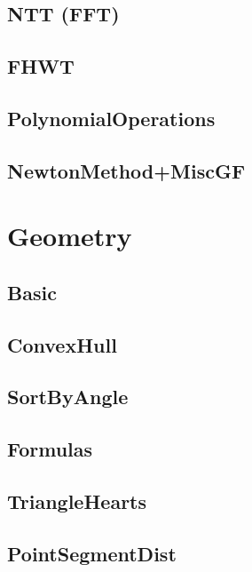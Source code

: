 \subsection{NTT (FFT)}


\subsection{FHWT}

\subsection{PolynomialOperations}

\subsection{NewtonMethod+MiscGF}

\section{Geometry}
\subsection{Basic}

\subsection{ConvexHull}

\subsection{SortByAngle}

\subsection{Formulas}

\subsection{TriangleHearts}

\subsection{PointSegmentDist}

